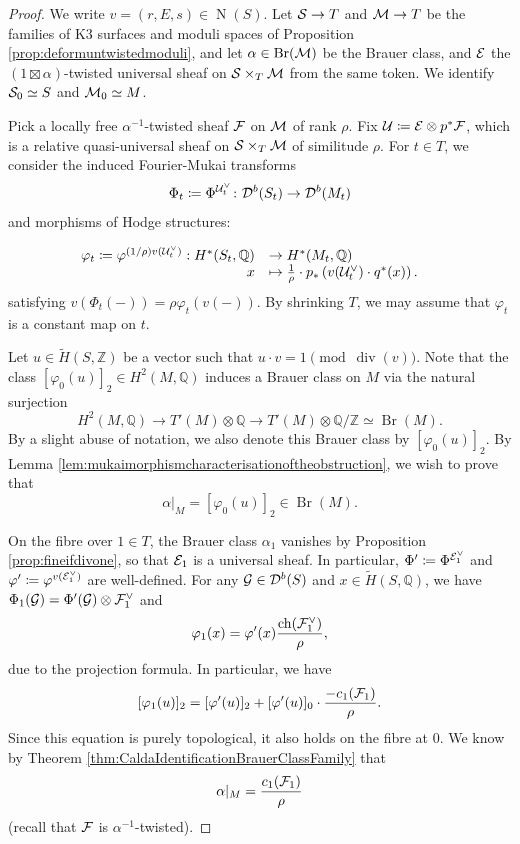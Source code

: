 \documentclass[11pt,twoside]{amsart}
\numberwithin{equation}{section}
\theoremstyle{definition}
\theoremstyle{plain}
\newcommand{\Z}{\ensuremath{\mathbb{Z}}}
\newcommand{\Q}{\ensuremath{\mathbb{Q}}}
\def\Db{\calD^{b}}
\def\Br{\operatorname{Br}}
\def\dv{\operatorname{div}}
\begin{document}
\begin{proof}
We write $v = (r,E,s)\in \operatorname{N}(S)$.
Let $\mathcal{S}\to T$ and $\mathcal{M}\to T$ be the families of K3 surfaces and moduli spaces of Proposition \ref{prop:deformuntwistedmoduli}, and let $\alpha\in \Br(\calM)$ be the Brauer class, and $\mathcal{E}$ the $(1\boxtimes \alpha)$-twisted universal sheaf on $\mathcal{S}\times_T \mathcal{M}$ from the same token. We identify $\mathcal{S}_0 \simeq S$ and $\mathcal{M}_0\simeq M$.


Pick a locally free $\alpha^{-1}$-twisted sheaf $\mathcal{F}$ on $\mathcal{M}$ of rank $\rho$. Fix $\mathcal{U}\coloneqq \mathcal{E}\otimes p^*\mathcal{F}$, which is a relative quasi-universal sheaf on $\mathcal{S}\times_T \mathcal{M}$ of similitude $\rho$. For $t\in T$, we consider the induced Fourier-Mukai transforms 
$$\Phi_t\coloneqq \Phi^{\calU_t^\vee}\colon \Db(S_t) \to \Db(M_t)$$
and morphisms of Hodge structures:

$$
 \begin{array}{rl@{\qquad}lr}
	\varphi_t\coloneqq \varphi^{(1/\rho) v(\calU_t^\vee)}: {H}^*(S_t,\Q)&\to H^*(M_t,\Q)  \\
	x&\mapsto \frac{1}{\rho}\cdot p_*\left(v(\calU_t^\vee)\cdot q^*(x)\right).
\end{array}
$$
satisfying 
$v\left( \Phi_t(-)\right)=\rho\varphi_t\left(v(-)\right)$.
By shrinking $T$, we may assume that $\varphi_t$ is a constant map on $t$.

Let $u\in \tilde{H}(S,\Z)$ be a vector such that $u\cdot v = 1 \pmod {\dv(v)}$. Note that the class $[\varphi_0(u)]_2 \in H^2(M,\Q)$ induces a Brauer class on $M$ via the natural surjection $$H^2(M,\Q)\to T'(M)\otimes \Q \to T'(M)\otimes \Q/\Z\simeq \Br(M).$$ By a slight abuse of notation, we also denote this Brauer class by $[\varphi_0(u)]_2.$ By Lemma \ref{lem:mukaimorphismcharacterisationoftheobstruction}, we wish to prove that $$\alpha|_{M} = [\varphi_0(u)]_2 \in \Br(M).$$

On the fibre over $1\in T$, the Brauer class $\alpha_1$ vanishes by Proposition \ref{prop:fineifdivone}, so that $\mathcal{E}_1$ is a universal sheaf. In particular, $\Phi'\coloneqq \Phi^{\mathcal{E}_1^\vee}$ and $\varphi'\coloneqq \varphi^{v(\mathcal{E}_1^\vee)}$ are well-defined. For any $\calG\in \Db(S)$ and $x\in \tilde{H}(S,\Q)$, we have
$\Phi_1(\mathcal{G})=\Phi'(\mathcal{G})\otimes \mathcal{F}^\vee_1$ and 
\begin{equation}\label{eq:phiprimeandphi}
\varphi_1(x)=\varphi'(x)\dfrac{\operatorname{ch}(\mathcal{F}^\vee_1)}{\rho},
\end{equation}
due to the projection formula. In particular, we have $$[\varphi_1(u)]_2=[\varphi'(u)]_2 + [\varphi'(u)]_0\cdot \dfrac{-c_1(\mathcal{F}_1)}{\rho}.$$
Since this equation is purely topological, it also holds on the fibre at $0$. We know by Theorem \ref{thm:CaldaIdentificationBrauerClassFamily} that $$\alpha|_M = \frac{c_1(\mathcal{F}_1)}{\rho}$$ 
(recall that $\mathcal{F}$ is $\alpha^{-1}$-twisted). 


\end{proof}
\end{document}
